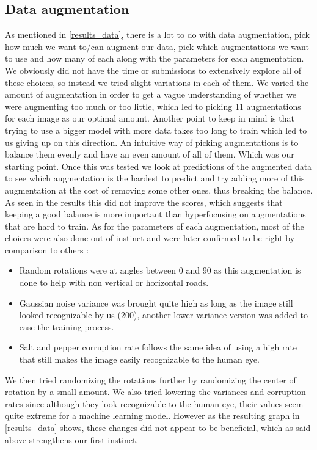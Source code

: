 \documentclass[10pt,conference,compsocconf]{IEEEtran}
\begin{document}
\subsection{Data augmentation}
As mentioned in \ref{results_data}, there is a lot to do with data augmentation, pick how much we want to/can augment our data, pick which augmentations we want to use and how many of each along with the parameters for each augmentation. We obviously did not have the time or submissions to extensively explore all of these choices, so instead we tried slight variations in each of them.
\newline
We varied the amount of augmentation in order to get a vague understanding of whether we were augmenting too much or too little, which led to picking 11 augmentations for each image as our optimal amount. Another point to keep in mind is that trying to use a bigger model with more data takes too long to train which led to us giving up on this direction.
\newline
An intuitive way of picking augmentations is to balance them evenly and have an even amount of all of them. Which was our starting point. Once this was tested we look at predictions of the augmented data to see which augmentation is the hardest to predict and try adding more of this augmentation at the cost of removing some other ones, thus breaking the balance. As seen in the results this did not improve the scores, which suggests that keeping a good balance is more important than hyperfocusing on augmentations that are hard to train.
\newline
As for the parameters of each augmentation, most of the choices were also done out of instinct and were later confirmed to be right by comparison to others : 
\begin{itemize}
\item Random rotations were at angles between 0 and 90 as this augmentation is done to help with non vertical or horizontal roads.
\item Gaussian noise variance was brought quite high as long as the image still looked recognizable by us (200), another lower variance version was added to ease the training process.
\item Salt and pepper corruption rate follows the same idea of using a high rate that still makes the image easily recognizable to the human eye.
\end{itemize}
We then tried randomizing the rotations further by randomizing the center of rotation by a small amount. We also tried lowering the variances and corruption rates since although they look recognizable to the human eye, their values seem quite extreme for a machine learning model. However as the resulting graph in \ref{results_data} shows, these changes did not appear to be beneficial, which as said above strengthens our first instinct.
\end{document}
